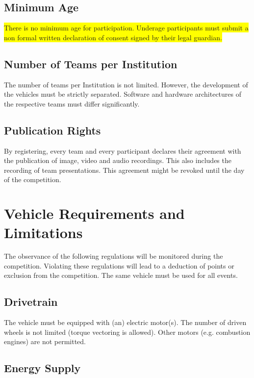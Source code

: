 \documentclass[a4paper]{report}
\begin{document}
\section{Minimum Age}

\colorbox{yellow}{There is no minimum age for participation. Underage participants must submit a non formal written declaration of consent signed by their legal guardian.} 

\section{Number of Teams per Institution}

The number of teams per Institution is not limited. However, the development of the vehicles must be strictly separated. Software and hardware architectures of the respective teams must differ significantly. 

\section{Publication Rights}

By registering, every team and every participant declares their agreement with the publication of image, video and audio recordings. This also includes the recording of team presentations. This agreement might be revoked until the day of the competition. 

\chapter{Vehicle Requirements and Limitations}

The observance of the following regulations will be monitored during the competition. Violating these regulations will lead to a deduction of points or exclusion from the competition. The same vehicle must be used for all events. 

\section{Drivetrain}

The vehicle must be equipped with (an) electric motor(s). The number of driven wheels is not limited (torque vectoring is allowed). Other motors (e.g. combustion engines) are not permitted. 

\section{Energy Supply}
\end{document}
